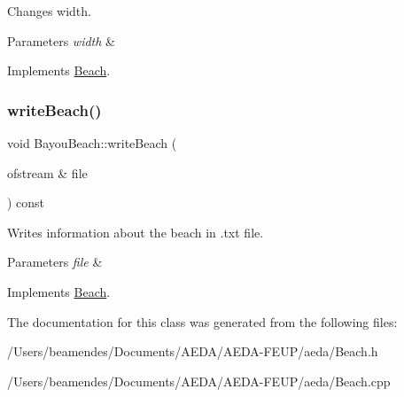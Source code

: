 Changes width. 


\begin{DoxyParams}{Parameters}
{\em width} & \\
\hline
\end{DoxyParams}


Implements \hyperlink{class_beach_a3f3a4bde9008bcc87861710e8c99c008}{Beach}.

\mbox{\label{class_bayou_beach_a16b3abbe3c2ebb1558d565f63178206a}} 
\subsubsection{\texorpdfstring{write\+Beach()}{writeBeach()}}
{\footnotesize\ttfamily void Bayou\+Beach\+::write\+Beach (\begin{DoxyParamCaption}\item[{ofstream \&}]{file }\end{DoxyParamCaption}) const\hspace{0.3cm}{\ttfamily [virtual]}}



Writes information about the beach in .txt file. 


\begin{DoxyParams}{Parameters}
{\em file} & \\
\hline
\end{DoxyParams}


Implements \hyperlink{class_beach_a2ba3bf80382fa1b5e00befe0c4ccde88}{Beach}.



The documentation for this class was generated from the following files\+:\begin{DoxyCompactItemize}
\item 
/\+Users/beamendes/\+Documents/\+A\+E\+D\+A/\+A\+E\+D\+A-\/\+F\+E\+U\+P/aeda/Beach.\+h\item 
/\+Users/beamendes/\+Documents/\+A\+E\+D\+A/\+A\+E\+D\+A-\/\+F\+E\+U\+P/aeda/Beach.\+cpp\end{DoxyCompactItemize}
